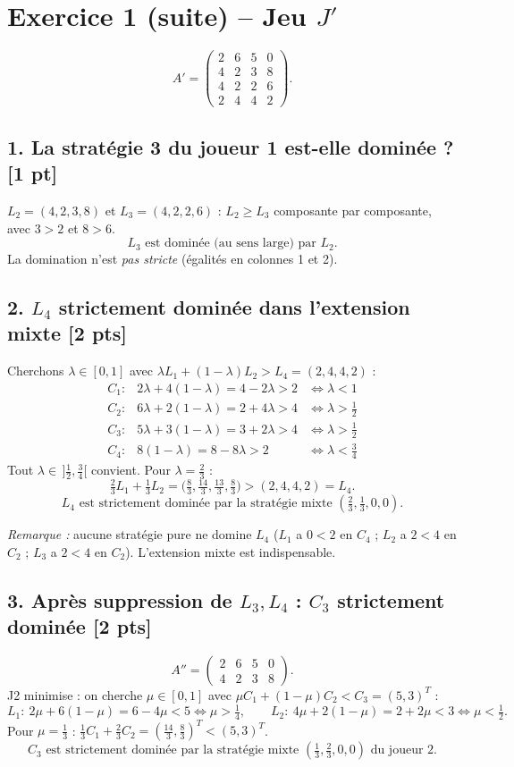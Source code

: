 \documentclass[11pt,a4paper]{article}
\begin{document}
\section*{Exercice 1 (suite) -- Jeu $J'$}
\[
A'=\begin{pmatrix}2&6&5&0\\4&2&3&8\\4&2&2&6\\2&4&4&2\end{pmatrix}.
\]

\subsection*{1. La stratégie 3 du joueur 1 est-elle dominée ? \hfill[1 pt]}
$L_2=(4,2,3,8)$ et $L_3=(4,2,2,6)$ : $L_2\ge L_3$ composante par composante, avec $3>2$ et $8>6$.
\[\boxed{L_3 \text{ est dominée (au sens large) par } L_2.}\]
La domination n'est \emph{pas stricte} (égalités en colonnes 1 et 2).

\subsection*{2. $L_4$ strictement dominée dans l'extension mixte \hfill[2 pts]}
Cherchons $\lambda\in[0,1]$ avec $\lambda L_1+(1-\lambda)L_2>L_4=(2,4,4,2)$ :
\[
\begin{array}{lll}
C_1: & 2\lambda+4(1-\lambda)=4-2\lambda>2 & \iff\lambda<1\\
C_2: & 6\lambda+2(1-\lambda)=2+4\lambda>4 & \iff\lambda>\frac12\\
C_3: & 5\lambda+3(1-\lambda)=3+2\lambda>4 & \iff\lambda>\frac12\\
C_4: & 8(1-\lambda)=8-8\lambda>2 & \iff\lambda<\frac34
\end{array}
\]
Tout $\lambda\in\,]\frac12,\frac34[$ convient. Pour $\lambda=\frac23$ :
\[
\tfrac23L_1+\tfrac13L_2=\Big(\tfrac83,\tfrac{14}3,\tfrac{13}3,\tfrac83\Big)>(2,4,4,2)=L_4.
\]
\[\boxed{L_4 \text{ est strictement dominée par la stratégie mixte } (\tfrac23,\tfrac13,0,0).}\]

\emph{Remarque :} aucune stratégie pure ne domine $L_4$ ($L_1$ a $0<2$ en $C_4$ ; $L_2$ a $2<4$ en $C_2$ ; $L_3$ a $2<4$ en $C_2$). L'extension mixte est indispensable.

\subsection*{3. Après suppression de $L_3,L_4$ : $C_3$ strictement dominée \hfill[2 pts]}
\[
A''=\begin{pmatrix}2&6&5&0\\4&2&3&8\end{pmatrix}.
\]
J2 minimise : on cherche $\mu\in[0,1]$ avec $\mu C_1+(1-\mu)C_2<C_3=(5,3)^T$ :
\[
L_1:\ 2\mu+6(1-\mu)=6-4\mu<5\iff\mu>\tfrac14,\qquad L_2:\ 4\mu+2(1-\mu)=2+2\mu<3\iff\mu<\tfrac12.
\]
Pour $\mu=\frac13$ : $\frac13C_1+\frac23C_2=(\frac{14}3,\frac83)^T<(5,3)^T$.
\[\boxed{C_3 \text{ est strictement dominée par la stratégie mixte } (\tfrac13,\tfrac23,0,0) \text{ du joueur 2.}}\]
\end{document}
